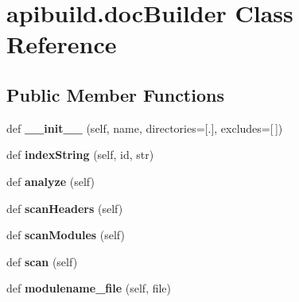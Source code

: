 \hypertarget{classapibuild_1_1doc_builder}{}\section{apibuild.\+doc\+Builder Class Reference}
\label{classapibuild_1_1doc_builder}
\subsection*{Public Member Functions}
\begin{DoxyCompactItemize}
\item 
\mbox{\label{classapibuild_1_1doc_builder_a452bff4f998dcafda0a86d01272e74c7}} 
def {\bfseries \+\_\+\+\_\+init\+\_\+\+\_\+} (self, name, directories=\mbox{[}\textquotesingle{}.\textquotesingle{}\mbox{]}, excludes=\mbox{[}$\,$\mbox{]})
\item 
\mbox{\label{classapibuild_1_1doc_builder_acf6be552790bf824a460534200ffd512}} 
def {\bfseries index\+String} (self, id, str)
\item 
\mbox{\label{classapibuild_1_1doc_builder_a16f7435b213bd62bd7fd6c039e5c4a24}} 
def {\bfseries analyze} (self)
\item 
\mbox{\label{classapibuild_1_1doc_builder_ae69be8471a58a650306110eadeec18b2}} 
def {\bfseries scan\+Headers} (self)
\item 
\mbox{\label{classapibuild_1_1doc_builder_aa646d2d7e95abb0ba02e1ba34b1e1715}} 
def {\bfseries scan\+Modules} (self)
\item 
\mbox{\label{classapibuild_1_1doc_builder_ad4f16b7c7844245df28aa102e8fa402e}} 
def {\bfseries scan} (self)
\item 
\mbox{\label{classapibuild_1_1doc_builder_af4a457d7b75eaf3db62249f4f96db37c}} 
def {\bfseries modulename\+\_\+file} (self, file)
\item 
\mbox{\label{classapibuild_1_1doc_builder_a9697dcbdb832c2fd43c3ad54a1df7926}} 

\end{DoxyCompactItemize}
